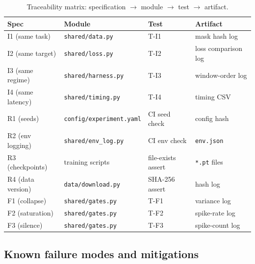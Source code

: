 \documentclass[11pt,a4paper]{article}
\begin{document}
\begin{table}[htbp]
\centering
\caption{Traceability matrix: specification $\to$ module $\to$ test
$\to$ artifact.}
\label{tab:traceability}
\smallskip
\renewcommand{\arraystretch}{1.1}
\begin{tabular}{@{}llll@{}}
\toprule
\textbf{Spec} & \textbf{Module} & \textbf{Test} & \textbf{Artifact} \\
\midrule
I1 (same task)
  & \texttt{shared/data.py}
  & T-I1
  & mask hash log \\
I2 (same target)
  & \texttt{shared/loss.py}
  & T-I2
  & loss comparison log \\
I3 (same regime)
  & \texttt{shared/harness.py}
  & T-I3
  & window-order log \\
I4 (same latency)
  & \texttt{shared/timing.py}
  & T-I4
  & timing CSV \\
R1 (seeds)
  & \texttt{config/experiment.yaml}
  & CI seed check
  & config hash \\
R2 (env logging)
  & \texttt{shared/env\_log.py}
  & CI env check
  & \texttt{env.json} \\
R3 (checkpoints)
  & training scripts
  & file-exists assert
  & \texttt{*.pt} files \\
R4 (data version)
  & \texttt{data/download.py}
  & SHA-256 assert
  & hash log \\
F1 (collapse)
  & \texttt{shared/gates.py}
  & T-F1
  & variance log \\
F2 (saturation)
  & \texttt{shared/gates.py}
  & T-F2
  & spike-rate log \\
F3 (silence)
  & \texttt{shared/gates.py}
  & T-F3
  & spike-count log \\
\bottomrule
\end{tabular}
\end{table}

\subsection{Known failure modes and mitigations}\label{sec:failure}
\end{document}
